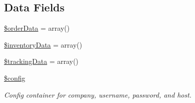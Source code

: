 \subsection*{Data Fields}
\begin{DoxyCompactItemize}
\item 
\hyperlink{class_fifth_gear_ab59d51cfeb47d712c0bc4279858fa42a}{\$order\-Data} = array()
\item 
\hyperlink{class_fifth_gear_a6cf95b6661c73fd102a42adcfd27eac8}{\$inventory\-Data} = array()
\item 
\hyperlink{class_fifth_gear_a4e53f41634cc74c85956e88fa81659c3}{\$tracking\-Data} = array()
\item 
\hyperlink{class_fifth_gear_a49c7011be9c979d9174c52a8b83e5d8e}{\$config}
\begin{DoxyCompactList}\small\item\em Config container for company, username, password, and host. \end{DoxyCompactList}\item 

\end{DoxyCompactItemize}
